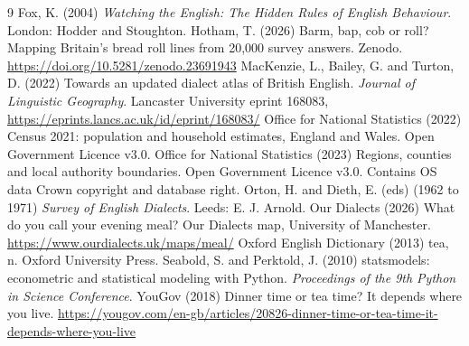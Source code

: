 \documentclass[11pt,a4paper]{article}
\begin{document}
\begin{thebibliography}{9}
 Fox, K. (2004) \emph{Watching the English: The Hidden Rules of English Behaviour}. London: Hodder and Stoughton.
 Hotham, T. (2026) Barm, bap, cob or roll? Mapping Britain's bread roll lines from 20,000 survey answers. Zenodo. \url{https://doi.org/10.5281/zenodo.23691943}
 MacKenzie, L., Bailey, G. and Turton, D. (2022) Towards an updated dialect atlas of British English. \emph{Journal of Linguistic Geography}. Lancaster University eprint 168083, \url{https://eprints.lancs.ac.uk/id/eprint/168083/}
 Office for National Statistics (2022) Census 2021: population and household estimates, England and Wales. Open Government Licence v3.0.
 Office for National Statistics (2023) Regions, counties and local authority boundaries. Open Government Licence v3.0. Contains OS data \textcopyright{} Crown copyright and database right.
 Orton, H. and Dieth, E. (eds) (1962 to 1971) \emph{Survey of English Dialects}. Leeds: E. J. Arnold.
 Our Dialects (2026) What do you call your evening meal? Our Dialects map, University of Manchester. \url{https://www.ourdialects.uk/maps/meal/}
 Oxford English Dictionary (2013) tea, n. Oxford University Press.
 Seabold, S. and Perktold, J. (2010) statsmodels: econometric and statistical modeling with Python. \emph{Proceedings of the 9th Python in Science Conference}.
 YouGov (2018) Dinner time or tea time? It depends where you live. \url{https://yougov.com/en-gb/articles/20826-dinner-time-or-tea-time-it-depends-where-you-live}
\end{thebibliography}
\end{document}
